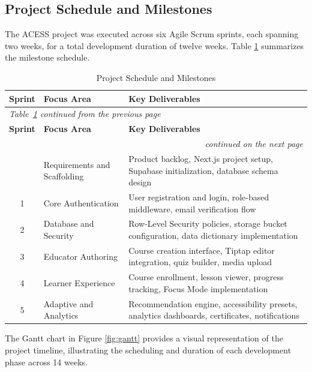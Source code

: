 \documentclass[12pt, oneside]{article} %
\begin{document}
\subsection{Project Schedule and Milestones}

The ACESS project was executed across six Agile Scrum sprints, each spanning two weeks, for a total development duration of twelve weeks. Table \ref{tab:project_schedule} summarizes the milestone schedule.

{
\renewcommand{\arraystretch}{1.3}
\footnotesize
\begin{longtable}{|c|l|p{7cm}|}
\caption{Project Schedule and Milestones}
\label{tab:project_schedule}\\
\hline
\textbf{Sprint} & \textbf{Focus Area} & \textbf{Key Deliverables} \\ \hline \hline
\endfirsthead
\multicolumn{3}{l}{\footnotesize\itshape Table~\ref{tab:project_schedule} continued from the previous page}\\
\hline
\textbf{Sprint} & \textbf{Focus Area} & \textbf{Key Deliverables} \\ \hline \hline
\endhead
\hline
\multicolumn{3}{r}{\footnotesize\itshape continued on the next page}\\
\endfoot
\endlastfoot
0 & Requirements and Scaffolding & Product backlog, Next.js project setup, Supabase initialization, database schema design \\ \hline
1 & Core Authentication & User registration and login, role-based middleware, email verification flow \\ \hline
2 & Database and Security & Row-Level Security policies, storage bucket configuration, data dictionary implementation \\ \hline
3 & Educator Authoring & Course creation interface, Tiptap editor integration, quiz builder, media upload \\ \hline
4 & Learner Experience & Course enrollment, lesson viewer, progress tracking, Focus Mode implementation \\ \hline
5 & Adaptive and Analytics & Recommendation engine, accessibility presets, analytics dashboards, certificates, notifications \\ \hline
\end{longtable}
}

The Gantt chart in Figure \ref{fig:gantt} provides a visual representation of the project timeline, illustrating the scheduling and duration of each development phase across 14 weeks.
\end{document}
